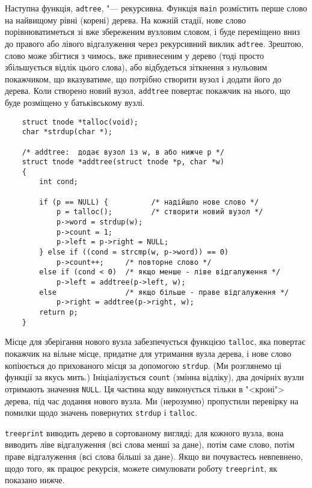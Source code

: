 \documentclass[a4paper,12pt]{book}
\begin{document}
  Наступна функція, \texttt{adtree}, "--- рекурсивна. Функція \texttt{main} розмістить
  перше слово на найвищому рівні (корені) дерева. На кожній стадії, нове слово
  порівнюватиметься зі вже збереженим вузловим словом, і буде переміщено вниз до правого
  або лівого відгалуження через рекурсивний виклик \texttt{adtree}. Зрештою, слово може
  збігтися з чимось, вже привнесеним у дерево (тоді просто збільшується відлік цього
  слова), або відбудеться зіткнення з нульовим покажчиком, що вказуватиме, що потрібно
  створити вузол і додати його до дерева. Коли створено новий вузол, \texttt{addtree}
  повертає покажчик на нього, що буде розміщено у батьківському вузлі.

  \begin{verbatim}
    struct tnode *talloc(void);
    char *strdup(char *);

    /* addtree:  додає вузол із w, в або нижче p */
    struct tnode *addtree(struct tnode *p, char *w)
    {
        int cond;

        if (p == NULL) {          /* надійшло нове слово */
            p = talloc();         /* створити новий вузол */
            p->word = strdup(w);
            p->count = 1;
            p->left = p->right = NULL;
        } else if ((cond = strcmp(w, p->word)) == 0)
            p->count++;     /* повторне слово */
        else if (cond < 0)  /* якщо менше - ліве відгалуження */
            p->left = addtree(p->left, w);
        else                /* якщо більше - праве відгалуження */
            p->right = addtree(p->right, w);
        return p;
    }
  \end{verbatim}

  Місце для зберігання нового вузла забезпечується функцією \texttt{talloc}, яка повертає
  покажчик на вільне місце, придатне для утримання вузла дерева, і нове слово копіюється
  до прихованого місця за допомогою \texttt{strdup}. (Ми розглянемо ці функції за якусь
  мить.) Ініціалізується \texttt{count} (змінна відліку), два дочірніх вузли отримають
  значення \texttt{NULL}. Ця частина коду виконується тільки в "<кроні"> дерева,
  під час додання нового вузла. Ми (нерозумно) пропустили перевірку на помилки щодо
  значень повернутих \texttt{strdup} і \texttt{talloc}.

  \texttt{treeprint} виводить дерево в сортованому вигляді; для кожного вузла, вона
  виводить ліве відгалуження (всі слова менші за дане), потім саме слово, потім праве
  відгалуження (всі слова більші за дане). Якщо ви почуваєтесь невпевнено, щодо того, як
  працює рекурсія, можете симулювати роботу
  \texttt{treeprint}, як показано нижче.
\end{document}
